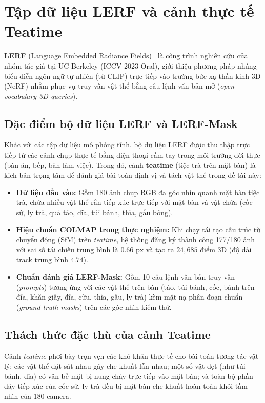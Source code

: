 \section{Tập dữ liệu LERF và cảnh thực tế Teatime}
\textbf{LERF} (Language Embedded Radiance Fields)~\cite{kerr2023lerf} là công trình nghiên cứu của nhóm tác giả tại UC Berkeley (ICCV 2023 Oral), giới thiệu phương pháp nhúng biểu diễn ngôn ngữ tự nhiên (từ CLIP) trực tiếp vào trường bức xạ thần kinh 3D (NeRF) nhằm phục vụ truy vấn vật thể bằng câu lệnh văn bản mở (\textit{open-vocabulary 3D queries}).

\subsection{Đặc điểm bộ dữ liệu LERF và LERF-Mask}
Khác với các tập dữ liệu mô phỏng tĩnh, bộ dữ liệu LERF được thu thập trực tiếp từ các cảnh chụp thực tế bằng điện thoại cầm tay trong môi trường đời thực (bàn ăn, bếp, bàn làm việc). Trong đó, cảnh \textbf{teatime} (tiệc trà trên mặt bàn) là kịch bản trọng tâm để đánh giá bài toán định vị và tách vật thể trong đề tài này:
\begin{itemize}
    \item \textbf{Dữ liệu đầu vào:} Gồm 180 ảnh chụp RGB đa góc nhìn quanh mặt bàn tiệc trà, chứa nhiều vật thể rắn tiếp xúc trực tiếp với mặt bàn và vật chứa (cốc sứ, ly trà, quả táo, đĩa, túi bánh, thìa, gấu bông).
    \item \textbf{Hiệu chuẩn COLMAP trong thực nghiệm:} Khi chạy tái tạo cấu trúc từ chuyển động (SfM) trên \textit{teatime}, hệ thống đăng ký thành công 177/180 ảnh với sai số tái chiếu trung bình là $0.66\text{ px}$ và tạo ra $24{,}685$ điểm 3D (độ dài track trung bình $4.74$).
    \item \textbf{Chuẩn đánh giá LERF-Mask:} Gồm 10 câu lệnh văn bản truy vấn (\textit{prompts}) tương ứng với các vật thể trên bàn (táo, túi bánh, cốc, bánh trên đĩa, khăn giấy, đĩa, cừu, thìa, gấu, ly trà) kèm mặt nạ phân đoạn chuẩn (\textit{ground-truth masks}) trên các góc nhìn kiểm thử.
\end{itemize}

\subsection{Thách thức đặc thù của cảnh Teatime}
Cảnh \textit{teatime} phơi bày trọn vẹn các khó khăn thực tế cho bài toán tương tác vật lý: các vật thể đặt sát nhau gây che khuất lẫn nhau; một số vật dẹt (như túi bánh, đĩa) có vân bề mặt bị nung chảy trực tiếp vào mặt bàn; và toàn bộ phần đáy tiếp xúc của cốc sứ, ly trà đều bị mặt bàn che khuất hoàn toàn khỏi tầm nhìn của 180 camera.
